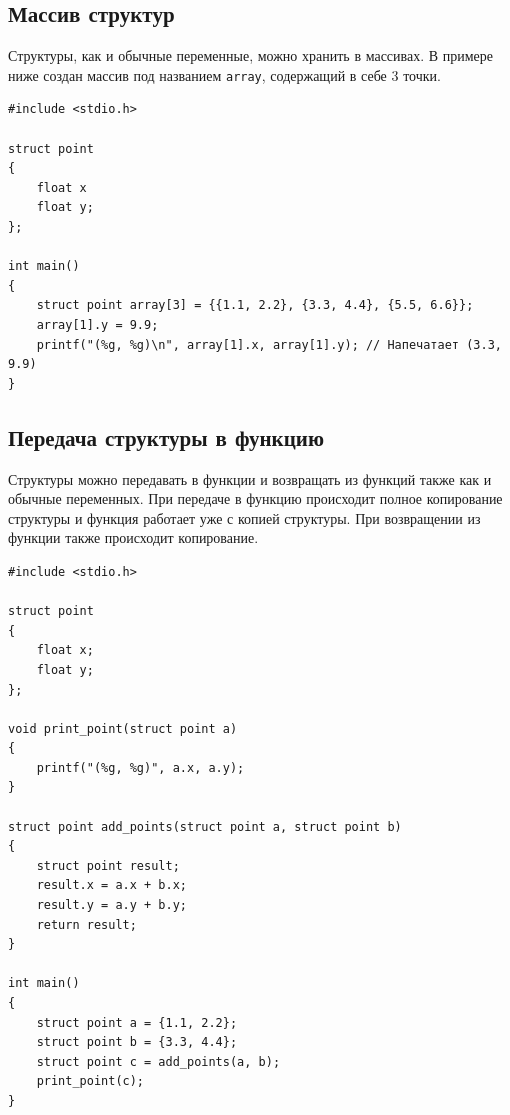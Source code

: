 \documentclass{article}
\begin{document}
\subsection*{Массив структур}
Структуры, как и обычные переменные, можно хранить в массивах. В примере ниже создан массив под названием \texttt{array}, содержащий в себе 3 точки.
\begin{lstlisting}
#include <stdio.h>

struct point 
{
    float x
    float y;
};

int main() 
{
    struct point array[3] = {{1.1, 2.2}, {3.3, 4.4}, {5.5, 6.6}};
    array[1].y = 9.9;
    printf("(%g, %g)\n", array[1].x, array[1].y); // Напечатает (3.3, 9.9)
}
\end{lstlisting}

\subsection*{Передача структуры в функцию}
Структуры можно передавать в функции и возвращать из функций также как и обычные переменных. При передаче в функцию происходит полное копирование структуры и функция работает уже с копией структуры. При возвращении из функции также происходит копирование.
\begin{lstlisting}
#include <stdio.h>

struct point 
{
    float x;
    float y;
};

void print_point(struct point a) 
{
    printf("(%g, %g)", a.x, a.y);
}

struct point add_points(struct point a, struct point b) 
{
    struct point result;
    result.x = a.x + b.x;
    result.y = a.y + b.y;
    return result;
}

int main() 
{
    struct point a = {1.1, 2.2}; 
    struct point b = {3.3, 4.4};
    struct point c = add_points(a, b);
    print_point(c);
}
\end{lstlisting}

\newpage
\end{document}
